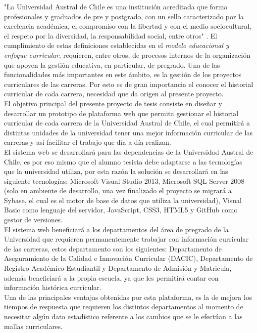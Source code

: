
			"La Universidad Austral de Chile es una institución acreditada que forma profesionales y graduados de pre 
			y postgrado, con un sello caracterizado por la excelencia académica, el compromiso con la libertad y con 
			el medio sociocultural, el respeto por la diversidad, la responsabilidad social, entre otros"\hspace{0.2cm} \cite{MOD07}. 
			El cumplimiento de estas definiciones establecidas en el \textit{ modelo educacional y enfoque curricular}, requieren, entre otros, de procesos internos de la organización que apoyen la gestión educativa, en particular, de pregrado. Una de las funcionalidades más importantes en este ámbito, es la gestión de los proyectos curriculares de las carreras. Por esto es de gran importancia el conocer el historial curricular de cada carrera, necesidad que da origen al presente proyecto.
			\\
			
			El objetivo principal del presente proyecto de tesis consiste en diseñar y desarrollar un prototipo de 
			plataforma web que permita gestionar el historial curricular de cada carrera de la Universidad Austral 
			de Chile, el cual permitirá a distintas unidades de la universidad tener una mejor información curricular 
			de las carreras y así facilitar el trabajo que día a día realizan.
			\\

			
			El sistema web se desarrollará para las dependencias de la Universidad Austral de Chile, es por eso mismo que
			el alumno tesista debe adaptarse a las tecnologías que la universidad utiliza, por esta razón la solución se 
			desarrollará en las siguiente tecnologías: Microsoft Visual Studio 2013, Microsoft SQL Server 2008 
			(solo en ambiente de desarrollo, una vez finalizado el proyecto se migrará a Sybase, el cual es el motor 
			de base de datos que utiliza la universidad), Visual Basic como lenguaje del servidor, JavaScript, CSS3, HTML5 
			y GitHub como gestor de versiones.
			\\

			
			El sistema web beneficiará a los departamentos del área de pregrado de la Universidad que requieren permanentemente trabajar con información curricular de las carreras, estos departamento son los siguientes: 
			Departamento de Aseguramiento de la Calidad e Innovación Curricular (DACIC), Departamento de Registro 
			Académico Estudiantil y  Departamento de Admisión y Matricula, además beneficiará a la propia escuela, ya que les permitirá contar con
			información histórica curricular.
			\\
			
			Una de las principales ventajas obtenidas por esta plataforma, es la de  mejora los tiempos de respuesta que requieren los distintos departamentos al momento de necesitar algún dato estadístico referente a los cambios que se le efectúan a las mallas curriculares. 
			

			